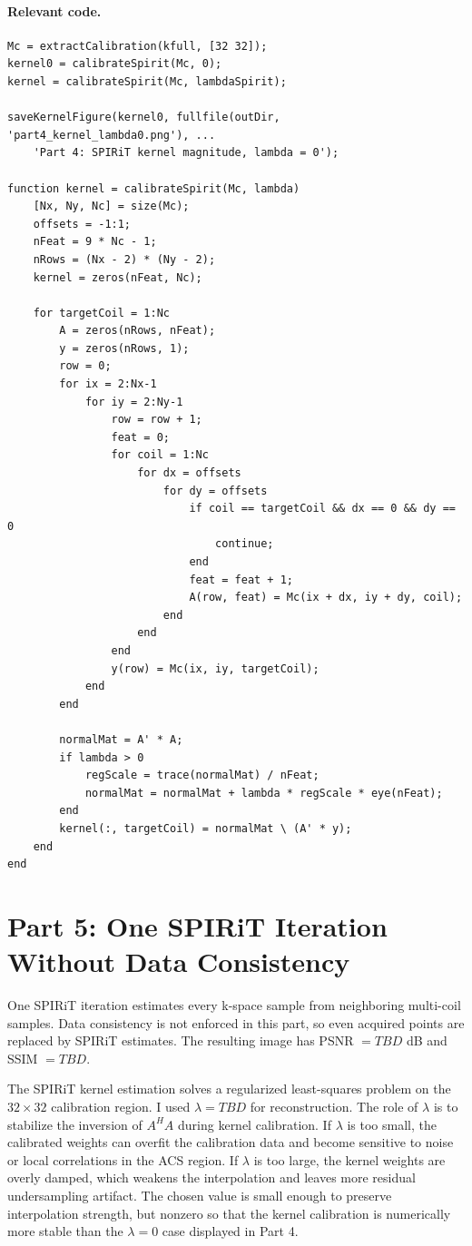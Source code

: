 \documentclass[11pt]{article}
\newcommand{\LambdaSpirit}{TBD}
\newcommand{\PSNRSpiritOneNoDC}{TBD}
\newcommand{\SSIMSpiritOneNoDC}{TBD}
\begin{document}
\paragraph{Relevant code.}
\begin{lstlisting}
Mc = extractCalibration(kfull, [32 32]);
kernel0 = calibrateSpirit(Mc, 0);
kernel = calibrateSpirit(Mc, lambdaSpirit);

saveKernelFigure(kernel0, fullfile(outDir, 'part4_kernel_lambda0.png'), ...
    'Part 4: SPIRiT kernel magnitude, lambda = 0');

function kernel = calibrateSpirit(Mc, lambda)
    [Nx, Ny, Nc] = size(Mc);
    offsets = -1:1;
    nFeat = 9 * Nc - 1;
    nRows = (Nx - 2) * (Ny - 2);
    kernel = zeros(nFeat, Nc);

    for targetCoil = 1:Nc
        A = zeros(nRows, nFeat);
        y = zeros(nRows, 1);
        row = 0;
        for ix = 2:Nx-1
            for iy = 2:Ny-1
                row = row + 1;
                feat = 0;
                for coil = 1:Nc
                    for dx = offsets
                        for dy = offsets
                            if coil == targetCoil && dx == 0 && dy == 0
                                continue;
                            end
                            feat = feat + 1;
                            A(row, feat) = Mc(ix + dx, iy + dy, coil);
                        end
                    end
                end
                y(row) = Mc(ix, iy, targetCoil);
            end
        end

        normalMat = A' * A;
        if lambda > 0
            regScale = trace(normalMat) / nFeat;
            normalMat = normalMat + lambda * regScale * eye(nFeat);
        end
        kernel(:, targetCoil) = normalMat \ (A' * y);
    end
end
\end{lstlisting}

\section{Part 5: One SPIRiT Iteration Without Data Consistency}
One SPIRiT iteration estimates every k-space sample from neighboring multi-coil samples. Data consistency is not enforced in this part, so even acquired points are replaced by SPIRiT estimates. The resulting image has PSNR $=\PSNRSpiritOneNoDC$ dB and SSIM $=\SSIMSpiritOneNoDC$.

The SPIRiT kernel estimation solves a regularized least-squares problem on the $32\times32$ calibration region. I used $\lambda=\LambdaSpirit$ for reconstruction. The role of $\lambda$ is to stabilize the inversion of $A^HA$ during kernel calibration. If $\lambda$ is too small, the calibrated weights can overfit the calibration data and become sensitive to noise or local correlations in the ACS region. If $\lambda$ is too large, the kernel weights are overly damped, which weakens the interpolation and leaves more residual undersampling artifact. The chosen value is small enough to preserve interpolation strength, but nonzero so that the kernel calibration is numerically more stable than the $\lambda=0$ case displayed in Part 4.
\end{document}
